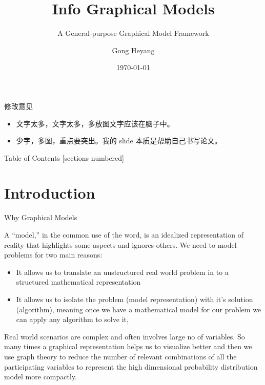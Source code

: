 \documentclass[10pt]{beamer}
\title{Info Graphical Models}
\subtitle{A General-purpose Graphical Model Framework}
\date{\today}
\author{Gong Heyang}
\institute{University of Science and Technology of China}
\begin{document}
\begin{CJK*}{UTF8}{gbsn}

\maketitle


\begin{frame}{修改意见}
    \begin{itemize}
        \item 文字太多，文字太多，多放图文字应该在脑子中。
        \item 少字，多图，重点要突出。我的 slide 本质是帮助自己书写论文。
    \end{itemize}
\end{frame}

\begin{frame}{Table of Contents}
  [sections numbered]
  \tableofcontents%
\end{frame}

\section[Intro]{Introduction}

\begin{frame}{Why Graphical Models}

    A “model,” in the common use of the word, is an idealized representation of reality that highlights some aspects and ignores others\cite{Pearl2009}. We need to model problems for two main reasons:
    
    
    \begin{itemize}
        \item  It allows us to translate an unstructured real world problem in to a structured mathematical representation
        \item It allows us to isolate the problem (model representation) with it’s solution (algorithm), meaning once we have a mathematical model for our problem we can apply any algorithm to solve it, 
    \end{itemize}
    
    Real world scenarios are complex and often involves large no of variables. So many times a graphical representation helps us to visualize better and then we use graph theory to reduce the number of relevant combinations of all the participating variables to represent the high dimensional probability distribution model more compactly.
    

\end{frame}
\end{CJK*}
\end{document}
